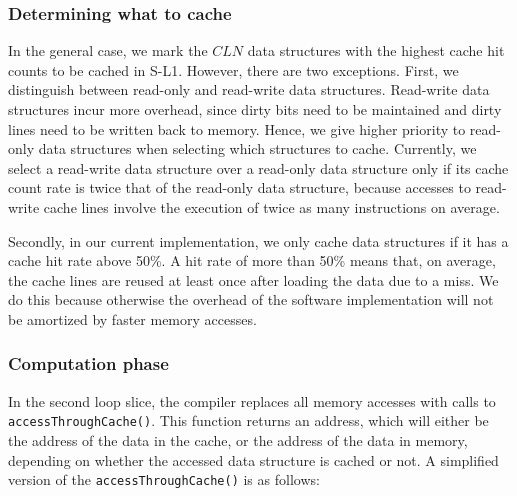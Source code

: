 \subsubsection{\bf Determining what to cache} 
In the general case, we mark the $CLN$ data structures with the highest cache hit counts to be cached
in S-L1.
However, there are two exceptions. 
First, we distinguish between read-only and read-write data structures.
Read-write data structures incur more overhead, since dirty bits need to be maintained and dirty
lines need to be written back to memory.
Hence, we give higher priority to read-only data structures when selecting which structures to
cache.
Currently, we select a read-write data structure over a read-only data structure only
if its cache count rate is twice that of the read-only data structure, because accesses to read-write
cache lines involve the execution of twice as many instructions on average.

Secondly, in our current implementation, we only cache data structures if it has a cache hit rate
above 50\%. A hit rate of more than 50\% means that, on average, the cache lines are reused at least once
after loading the data due to a miss.
We do this because otherwise the overhead of the software implementation will not be amortized by faster memory accesses.

\subsubsection{Computation phase}
In the second loop slice, the compiler replaces all memory accesses with calls to
\texttt{accessThroughCache()}. 
This function returns an address, which will either be the address of the data in the cache, or the
address of the data in memory, depending on whether the accessed data structure is cached or not. 
A simplified version of the \texttt{accessThroughCache()} is as follows:

